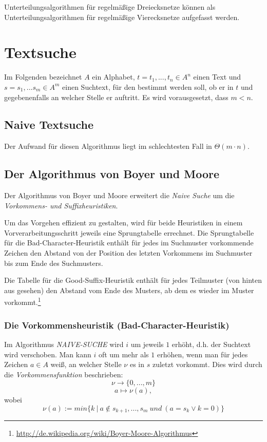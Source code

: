 Unterteilungsalgorithmen für regelmäßige Dreiecksnetze können als Unterteilungsalgorithmen für regelmäßige Vierecksnetze aufgefasst werden.



\section{Textsuche}
Im Folgenden bezeichnet \(A\) ein Alphabet, \(t = t_1,...,t_n \in A^n\) einen Text und \(s = s_1,...s_m \in A^m\) einen Suchtext, für den bestimmt werden soll, ob er in \(t\) und gegebenenfalls an welcher Stelle er auftritt. Es wird vorausgesetzt, dass \(m < n\).

\subsection{Naive Textsuche}

Der Aufwand für diesen Algorithmus liegt im schlechtesten Fall in \(\Theta(m\cdot n)\).


\subsection{Der Algorithmus von Boyer und Moore}
Der Algorithmus von Boyer und Moore erweitert die \textit{Naive Suche} um die \textit{Vorkommens- und Suffixheuristiken}.

Um das Vorgehen effizient zu gestalten, wird für beide Heuristiken in einem Vorverarbeitungsschritt jeweils eine Sprungtabelle errechnet. Die Sprungtabelle für die Bad-Character-Heuristik enthält für jedes im Suchmuster vorkommende Zeichen den Abstand von der Position des letzten Vorkommens im Suchmuster bis zum Ende des Suchmusters.

Die Tabelle für die Good-Suffix-Heuristik enthält für jedes Teilmuster (von hinten aus gesehen) den Abstand vom Ende des Musters, ab dem es wieder im Muster vorkommt.\footnote{\url{http://de.wikipedia.org/wiki/Boyer-Moore-Algorithmus}}

\subsubsection{Die Vorkommensheuristik (Bad-Character-Heuristik)}
Im Algorithmus \textit{NAIVE-SUCHE} wird \(i\) um jeweils \(1\) erhöht, d.h. der Suchtext wird verschoben. Man kann \(i\) oft um mehr als \(1\) erhöhen, wenn man für jedes Zeichen \(a \in A\) weiß, an welcher Stelle \(\nu\) es in \(s\) zuletzt vorkommt. Dies wird durch die \textit{Vorkommensfunktion} beschrieben:
\[\nu \rightarrow \{0,...,m\}\]
\[a \mapsto \nu(a),\]
wobei
\[\nu(a) := min\{k~|~a \notin s_{k+1},...,s_m~und~(a=s_k \lor k=0)\}\]


